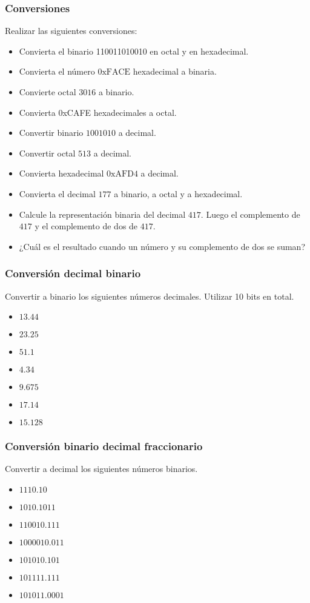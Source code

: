 \subsubsection{Conversiones}
Realizar las siguientes conversiones:
\begin{itemize}
  \item Convierta el binario 110011010010 en octal y en hexadecimal.
  \item Convierta el número $\mathrm{0xFACE}$ hexadecimal a binaria.
  \item Convierte octal $\mathrm{3016}$ a binario.
  \item Convierta 0xCAFE hexadecimales a octal.
  \item Convertir binario $\mathrm{1001010}$ a decimal.
  \item Convertir octal $\mathrm{513}$ a decimal.
  \item Convierta hexadecimal $\mathrm{0xAFD4}$ a decimal.
  \item Convierta el decimal $\mathrm{177}$ a binario, a octal y a hexadecimal.
  \item Calcule la representación binaria del decimal $\mathrm{417}$. Luego el complemento de $\mathrm{417}$ y el complemento de dos de $\mathrm{417}$.
  \item ¿Cuál es el resultado cuando un número y su complemento de dos se suman?
\end{itemize}

\subsubsection{Conversión decimal binario}
Convertir a binario los siguientes números decimales. Utilizar 10 bits en total.
\begin{itemize}
  \item $13.44$
  \item $23.25$
  \item $51.1$
  \item $4.34$
  \item $9.675$
  \item $17.14$
  \item $15.128$
\end{itemize}

\subsubsection{Conversión binario decimal fraccionario}
Convertir a decimal los siguientes números binarios.
\begin{itemize}
  \item $\mathrm{1110.10}$
  \item $\mathrm{1010.1011}$
  \item $\mathrm{110010.111}$
  \item $\mathrm{1000010.011}$
  \item $\mathrm{101010.101}$
  \item $\mathrm{101111.111}$
  \item $\mathrm{101011.0001}$
\end{itemize}

